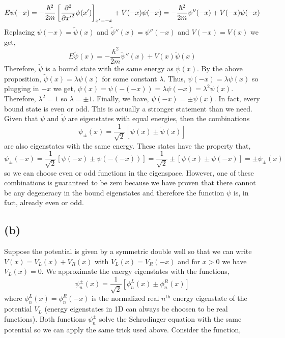 \documentclass[12pt]{extarticle}
\newcommand{\pL}{\phi^L_n}
\newcommand{\pR}{\phi^R_n}
\newcommand{\pspm}{\psi_{n}^{\pm}}
\begin{document}
\[E \psi(-x) = -\frac{\hbar^2}{2m} \left[\frac{\partial^2{}}{\partial{x'}^2} \psi(x') \right]_{x' = -x} + V(-x) \psi(-x) = -\frac{\hbar^2}{2m} \psi''(-x) + V(-x) \psi(-x) \]  
Replacing $\psi(-x) = \tilde{\psi}(x)$ and $\tilde{\psi}''(x) = \psi''(-x)$ and $V(-x) = V(x)$ we get,
\[E \tilde{\psi}(x) = -\frac{\hbar^2}{2m} \tilde{\psi}''(x) + V(x) \tilde{\psi}(x) \] 
Therefore, $\tilde{\psi}$ is a bound state with the same energy as $\psi(x)$. By the above proposition, $\tilde{\psi}(x) = \lambda \psi(x)$ for some constant $\lambda$. Thus, $\psi(-x) = \lambda \psi(x)$ so plugging in $-x$ we get, $\psi(x) = \psi(-(-x)) = \lambda \psi(-x) = \lambda^2 \psi(x)$. Therefore, $\lambda^2 = 1$ so $\lambda = \pm 1$.
Finally, we have, $\psi(-x) = \pm \psi(x)$. In fact, every bound state is even or odd. This is actually a stronger statement than we need. Given that $\psi$ and $\tilde{\psi}$ are eigenstates with equal energies, then the combinations \[ \psi_{\pm}(x) =  \frac{1}{\sqrt{2}} \left[ \psi(x) \pm \tilde{\psi}(x) \right] \] are also eigenstates with the same energy. These states have the property that, \[ \psi_{\pm}(-x) = \frac{1}{\sqrt{2}} \left[ \psi(-x) \pm \psi(-(-x)) \right] = \frac{1}{\sqrt{2}} \pm \left[ \psi(x) \pm \psi(-x) \right] = \pm \psi_{\pm}(x)\]
so we can choose even or odd functions in the eigenspace. However, one of these combinations is guaranteed to be zero because we have proven that there cannot be any degeneracy in the bound eigenstates and therefore the function $\psi$ is, in fact, already even or odd. 

\subsection*{(b)}

Suppose the potential is given by a symmetric double well so that we can write $V(x) = V_L(x) + V_R(x)$ with $V_L(x) = V_R(-x)$ and for $x > 0$ we have $V_L(x) = 0$. We approximate the energy eigenstates with the functions,
\[ \pspm(x) = \frac{1}{\sqrt{2}} \left[ \pL(x) \pm \pR(x) \right]\]
where $\pL(x) = \phi^R_n(-x)$ is the normalized real $n^{\mathrm{th}}$ energy eigenstate of the potential $V_L$ (energy eigenstates in 1D can always be choosen to be real functions). Both functions $\pspm$ solve the Schrodinger equation with the same potential so we can apply the same trick used above. Consider the function,
\end{document}
